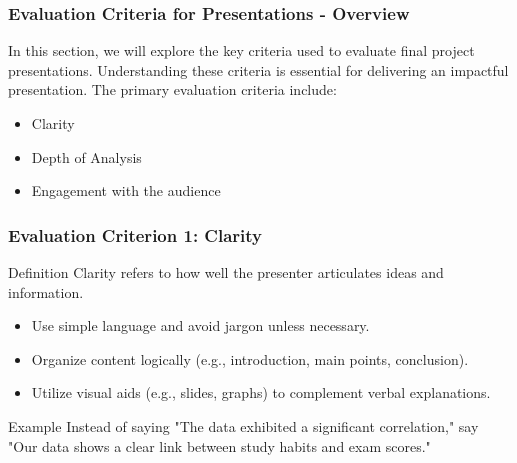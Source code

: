\documentclass[aspectratio=169]{beamer}
\begin{document}
\begin{frame}[fragile]
    \frametitle{Evaluation Criteria for Presentations - Overview}
    In this section, we will explore the key criteria used to evaluate final project presentations. 
    Understanding these criteria is essential for delivering an impactful presentation. 
    The primary evaluation criteria include:
    \begin{itemize}
        \item Clarity
        \item Depth of Analysis
        \item Engagement with the audience
    \end{itemize}
\end{frame}

\begin{frame}[fragile]
    \frametitle{Evaluation Criterion 1: Clarity}
    \begin{block}{Definition}
        Clarity refers to how well the presenter articulates ideas and information.
    \end{block}
    
    \begin{itemize}
        \item Use simple language and avoid jargon unless necessary.
        \item Organize content logically (e.g., introduction, main points, conclusion).
        \item Utilize visual aids (e.g., slides, graphs) to complement verbal explanations.
    \end{itemize}

    \begin{block}{Example}
        Instead of saying "The data exhibited a significant correlation," say 
        "Our data shows a clear link between study habits and exam scores."
    \end{block}
\end{frame}
\end{document}
